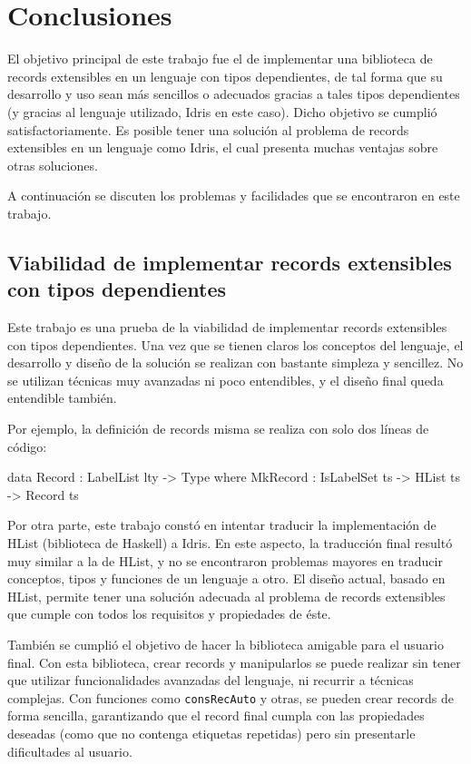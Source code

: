
\chapter{Conclusiones}
\label{ch:5}

El objetivo principal de este trabajo fue el de implementar una biblioteca de records extensibles en un lenguaje con tipos dependientes, de tal forma que su desarrollo y uso sean más sencillos o adecuados gracias a tales tipos dependientes (y gracias al lenguaje utilizado, Idris en este caso). Dicho objetivo se cumplió satisfactoriamente. Es posible tener una solución al problema de records extensibles en un lenguaje como Idris, el cual presenta muchas ventajas sobre otras soluciones.

A continuación se discuten los problemas y facilidades que se encontraron en este trabajo.

\section{Viabilidad de implementar records extensibles con tipos dependientes}

Este trabajo es una prueba de la viabilidad de implementar records extensibles con tipos dependientes. Una vez que se tienen claros los conceptos del lenguaje, el desarrollo y diseño de la solución se realizan con bastante simpleza y sencillez. No se utilizan técnicas muy avanzadas ni poco entendibles, y el diseño final queda entendible también.

Por ejemplo, la definición de records misma se realiza con solo dos líneas de código:

\begin{code}
data Record : LabelList lty -> Type where
  MkRecord : IsLabelSet ts -> HList ts -> Record ts
\end{code}

Por otra parte, este trabajo constó en intentar traducir la implementación de HList (biblioteca de Haskell) a Idris. En este aspecto, la traducción final resultó muy similar a la de HList, y no se encontraron problemas mayores en traducir conceptos, tipos y funciones de un lenguaje a otro. El diseño actual, basado en HList, permite tener una solución adecuada al problema de records extensibles que cumple con todos los requisitos y propiedades de éste.

También se cumplió el objetivo de hacer la biblioteca amigable para el usuario final. Con esta biblioteca, crear records y manipularlos se puede realizar sin tener que utilizar funcionalidades avanzadas del lenguaje, ni recurrir a técnicas complejas. Con funciones como \texttt{consRecAuto} y otras, se pueden crear records de forma sencilla, garantizando que el record final cumpla con las propiedades deseadas (como que no contenga etiquetas repetidas) pero sin presentarle dificultades al usuario.

